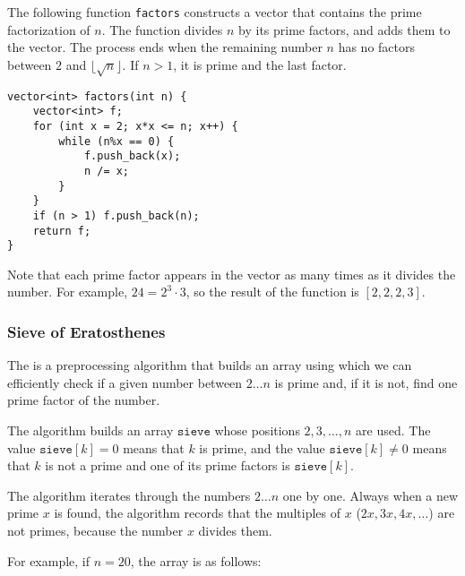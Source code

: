 \noindent
The following function \texttt{factors}
constructs a vector that contains the prime
factorization of $n$.
The function divides $n$ by its prime factors,
and adds them to the vector.
The process ends when the remaining number $n$
has no factors between $2$ and $\lfloor \sqrt n \rfloor$.
If $n>1$, it is prime and the last factor.

\begin{lstlisting}
vector<int> factors(int n) {
    vector<int> f;
    for (int x = 2; x*x <= n; x++) {
        while (n%x == 0) {
            f.push_back(x);
            n /= x;
        }
    }
    if (n > 1) f.push_back(n);
    return f;
}
\end{lstlisting}

Note that each prime factor appears in the vector
as many times as it divides the number.
For example, $24=2^3 \cdot 3$,
so the result of the function is $[2,2,2,3]$.

\subsubsection{Sieve of Eratosthenes}


The 
is a preprocessing
algorithm that builds an array using which we
can efficiently check if a given number between $2 \ldots n$
is prime and, if it is not, find one prime factor of the number.

The algorithm builds an array $\texttt{sieve}$
whose positions $2,3,\ldots,n$ are used.
The value $\texttt{sieve}[k]=0$ means
that $k$ is prime,
and the value $\texttt{sieve}[k] \neq 0$
means that $k$ is not a prime and one
of its prime factors is $\texttt{sieve}[k]$.

The algorithm iterates through the numbers
$2 \ldots n$ one by one.
Always when a new prime $x$ is found,
the algorithm records that the multiples
of $x$ ($2x,3x,4x,\ldots$) are not primes,
because the number $x$ divides them.

For example, if $n=20$, the array is as follows:

